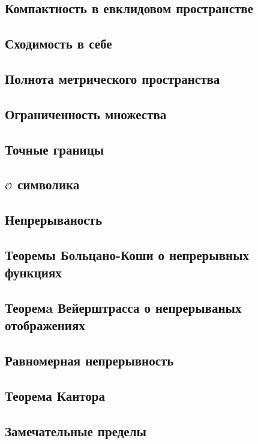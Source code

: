 \subsection{Компактность в евклидовом пространстве}

\skip
\subsection{Сходимость в себе}

\skip
\subsection{Полнота метрического пространства}

\skip
\subsection{Ограниченность множества}

\skip
\subsection{Точные границы}

\skip
\subsection{$\mathcal{O}$ символика}

\skip
\subsection{Непрерываность}

\skip
\subsection{Теоремы Больцано-Коши о непрерывных функциях}

\skip
\subsection{Теоремa Вейерштрасса о непрерываных отображениях}

\skip
\subsection{Равномерная непрерывность}

\skip
\subsection{Теорема Кантора}

\skip
\subsection{Замечательные пределы}

\skip
